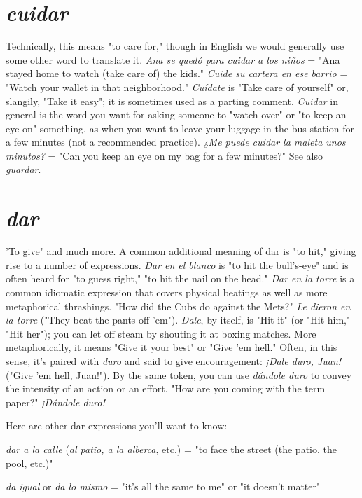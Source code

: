 \documentclass[14pt,a4paper,oneside]{memoir}
\newcommand{\bsk}{\vspace{20pt}}
\newcommand{\indu}{\hspace{20pt}}
\begin{document}
\section{\emph{cuidar}}

Technically, this means "to care for," though in English we
would generally use some other word to translate it. \emph{Ana se quedó
para cuidar a los niños} = "Ana stayed home to watch (take care of)
the kids." \emph{Cuide su cartera en ese barrio} = "Watch your wallet in that
neighborhood." \emph{Cuídate} is "Take care of yourself" or, slangily, "Take it
easy"; it is sometimes used as a parting comment. \emph{Cuidar} in general is
the word you want for asking someone to "watch over" or "to keep an
eye on" something, as when you want to leave your luggage in the bus
station for a few minutes (not a recommended practice). \emph{¿Me puede
cuidar la maleta unos minutos?} = "Can you keep an eye on my bag
for a few minutes?" See also \emph{guardar}.

\section{\emph{dar}}

'To give" and much more. A common additional meaning of
dar is "to hit," giving rise to a number of expressions. \emph{Dar en el blanco}
is "to hit the bull's-eye" and is often heard for "to guess right," "to hit
the nail on the head." \emph{Dar en la torre} is a common idiomatic expression that covers physical beatings as well as more metaphorical thrashings. "How did the Cubs do against the Mets?" \emph{Le dieron en la torre}
("They beat the pants off 'em"). \emph{Dale}, by itself, is "Hit it" (or "Hit
him," "Hit her"); you can let off steam by shouting it at boxing matches.
More metaphorically, it means "Give it your best" or "Give 'em hell."
Often, in this sense, it's paired with \emph{duro} and said to give encouragement: \emph{¡Dale duro, Juan!} ("Give 'em hell, Juan!"). By the same token,
you can use \emph{dándole duro} to convey the intensity of an action or an
effort. "How are you coming with the term paper?" \emph{¡Dándole duro!}

Here are other dar expressions you'll want to know:

\bsk

\indu \emph{dar a la calle} (\emph{al patio, a la alberca}, etc.) = "to face the street
(the patio, the pool, etc.)"

\indu \emph{da igual} or \emph{da lo mismo} = "it's all the same to me" or "it
doesn't matter"
\end{document}
